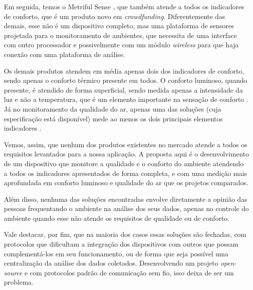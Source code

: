 \documentclass[]{politex}
\begin{document}
Em seguida, temos o Metriful Sense \cite{metriful}, que também atende a todos os indicadores de conforto, que é um produto novo em \textit{crowdfunding}. Diferentemente das demais, esse não é um dispositivo completo, mas uma plataforma de sensores projetada para o monitoramento de ambientes, que necessita de uma interface com outro processador e possivelmente com um módulo \textit{wireless} para que haja conexão com uma plataforma de análise. 

Os demais produtos atendem em média apenas dois dos indicadores de conforto, sendo apenas o conforto térmico presente em todos. O conforto luminoso, quando presente, é atendido de forma superficial, sendo medida apenas a intensidade da luz e não a temperatura, que é um elemento importante na sensação de conforto \cite{VisualComfort}. Já no monitoramento da qualidade do ar, apenas uma das soluções \cite{ECOMLITE} (cuja especificação está disponível) mede ao menos os dois principais elementos indicadores \cite{AirQuality}. 

Vemos, assim, que nenhum dos produtos existentes no mercado atende a todos os requisitos levantados para a nossa aplicação. A proposta aqui é o desenvolvimento de um dispositivo que monitore a qualidade e o conforto do ambiente atendendo a todos os indicadores apresentados de forma completa, e com uma medição mais aprofundada em conforto luminoso e qualidade do ar que os projetos comparados. 

Além disso, nenhuma das soluções encontradas envolve diretamente a opinião das pessoas frequentando o ambiente na análise dos seus dados, apenas no controle do ambiente quando esse não atende os requisitos de qualidade ou de conforto. 

Vale destacar, por fim, que na maioria dos casos essas soluções são fechadas, com protocolos que dificultam a integração dos dispositivos com outros que possam complementá-los em seu funcionamento, ou de forma que seja possível uma centralização da análise dos dados coletados. Desenvolvendo um projeto \textit{open-source} e com protocolos padrão de comunicação sem fio, isso deixa de ser um problema. 


%


%


\end{document}
